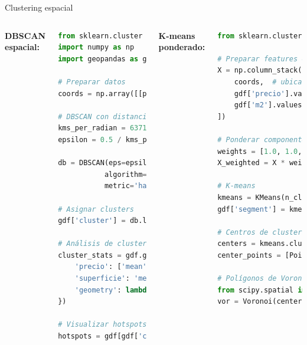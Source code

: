 \documentclass[10pt,aspectratio=169]{beamer}
\begin{document}
\begin{frame}[fragile]{Clustering espacial}
    \begin{columns}[T]
        \textbf{DBSCAN espacial:}
        \begin{lstlisting}[language=Python]
from sklearn.cluster import DBSCAN
import numpy as np
import geopandas as gpd

# Preparar datos
coords = np.array([[p.x, p.y] for p in gdf.geometry])

# DBSCAN con distancia en metros
kms_per_radian = 6371.0088
epsilon = 0.5 / kms_per_radian  # 500 metros

db = DBSCAN(eps=epsilon, min_samples=5, 
           algorithm='ball_tree', 
           metric='haversine').fit(np.radians(coords))

# Asignar clusters
gdf['cluster'] = db.labels_

# Análisis de clusters
cluster_stats = gdf.groupby('cluster').agg({
    'precio': ['mean', 'std', 'count'],
    'superficie': 'mean',
    'geometry': lambda x: x.unary_union.centroid
})

# Visualizar hotspots
hotspots = gdf[gdf['cluster'] != -1]
        \end{lstlisting}
        
        \textbf{K-means ponderado:}
        \begin{lstlisting}[language=Python]
from sklearn.cluster import KMeans

# Preparar features espaciales y atributos
X = np.column_stack([
    coords,  # ubicación
    gdf['precio'].values / 1e6,  # normalizado
    gdf['m2'].values / 100
])

# Ponderar componentes
weights = [1.0, 1.0, 0.5, 0.3]  # x,y,precio,m2
X_weighted = X * weights

# K-means
kmeans = KMeans(n_clusters=5, random_state=42)
gdf['segment'] = kmeans.fit_predict(X_weighted)

# Centros de clusters
centers = kmeans.cluster_centers_ / weights
center_points = [Point(c[0], c[1]) for c in centers]

# Polígonos de Voronoi para áreas de mercado
from scipy.spatial import Voronoi
vor = Voronoi(centers[:, :2])
        \end{lstlisting}
    \end{columns}
\end{frame}
\end{document}
